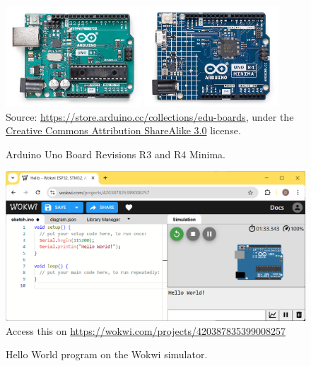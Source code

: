 \begin{figure}
  \begin{wide}
    \hfill
    \includegraphics[width=0.45\textwidth]{img/arduino_uno_rev3}
    \hfill
    \includegraphics[width=0.45\textwidth]{img/arduino_uno_rev4}
    \hfill
    \\ \scriptsize
    Source: \url{https://store.arduino.cc/collections/edu-boards}, under the \href{https://creativecommons.org/licenses/by-sa/3.0/legalcode}{Creative Commons Attribution ShareAlike 3.0} license.
    \caption{Arduino Uno Board Revisions R3 and R4 Minima.}
    \label{fig:arduino_uno}
  \end{wide}
\end{figure}

\begin{figure}
  \begin{wide}
    \includegraphics[width=\textwidth]{img/wokwi-hello.png}
    \\ \scriptsize
    Access this on \url{https://wokwi.com/projects/420387835399008257}
    \caption{Hello World program on the Wokwi simulator.}
    \label{fig:wokwi-hello}    
  \end{wide}
\end{figure}

